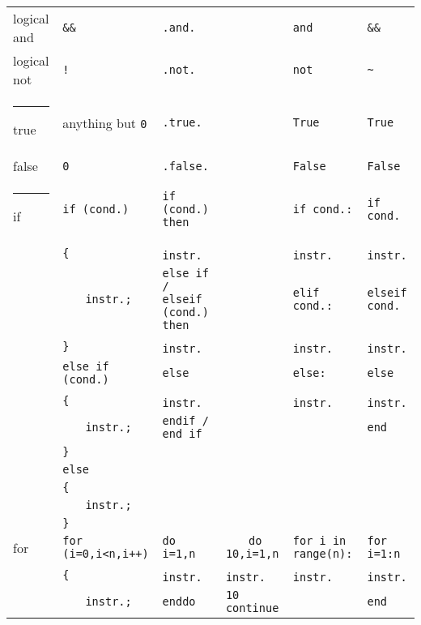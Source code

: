 \documentclass[a3paper,10pt,portrait]{article}
\makeatletter
\def\hlinewd#1{%
\noalign{\ifnum0=`}\fi\hrule \@height #1 %
\futurelet\reserved@a\@xhline}
\renewcommand{\hline}{\hlinewd{0.1pt}}	%
\newcommand{\incr}{$\phantom{mm}$}
\makeatother
\begin{document}
\begin{center}
\begin{tabular}{p{4cm} p{4cm} p{4cm} p{4cm} p{4cm} p{4cm}}
logical and		& \verb|&&|		& \multicolumn{2}{p{3.0cm}}{\texttt{.and.}} 	& \verb|and| 		& \verb|&&| 	\\
logical not		& \verb|!|		& \multicolumn{2}{p{3.0cm}}{\texttt{.not.}} 	& \verb|not| 		& \verb|~| 	\\
\hline
true			& anything but \verb|0| & \multicolumn{2}{p{3.0cm}}{\texttt{.true.}} 	& \verb|True| 		& \verb|True| 		\\
false		& \verb|0|			& \multicolumn{2}{p{3.0cm}}{\texttt{.false.}} 	& \verb|False| 		& \verb|False| 		\\
\hline
if			& \verb|if (cond.)|			& \verb|if (cond.) then|				& \verb|| & \verb|if cond.:|		& \verb|if cond.|					\\
			& \verb|{| 				& \incr\verb|instr.| 			& \verb|| & \incr\verb|instr.|	& \incr\verb|instr.|			\\
		& \incr\verb|instr.;|	& \verb|else if / elseif (cond.) then| & & \verb|elif cond.:| & \verb|elseif cond.|								\\
			& \verb|}| 				& \incr\verb|instr.| 			& \verb|| & \incr\verb|instr.|	& \incr\verb|instr.| 			\\
			& \verb|else if (cond.)| 		& \verb|else| 						& \verb|| & \verb|else:| & \verb|else| 									\\
			& \verb|{| 				& \incr\verb|instr.| 			& \verb|| & \incr\verb|instr.|	& \incr\verb|instr.| 			\\
			& \incr\verb|instr.;| 	& \verb|endif / end if| 			& \verb|| & \verb||				& \verb|end| 						\\
			& \verb|}| 				& \verb|| & \verb|| & \verb|| & \verb|| \\
			& \verb|else| 				& \verb|| & \verb|| & \verb|| & \verb|| \\
			& \verb|{| 				& \verb|| & \verb|| & \verb|| & \verb|| \\
			& \incr\verb|instr.;| 			& \verb|| & \verb|| & \verb|| & \verb|| \\
			& \verb|}| 				& \verb|| & \verb|| & \verb|| & \verb|| \\
for			& \verb|for (i=0,i<n,i++)|	& \verb|do i=1,n|	& \incr\verb|do 10,i=1,n|	& \verb|for i in range(n):|	& \verb|for i=1:n|	\\
			& \verb|{| 			& \incr\verb|instr.|	& \incr\incr\verb|instr.| 	& \incr\verb|instr.| 		& \incr\verb|instr.| 	\\
			& \incr\verb|instr.;| 		& \verb|enddo| 		& \verb|10 continue| 		& \verb|| 			& \verb|end|		\\

\end{tabular}
\end{center}
\end{document}
